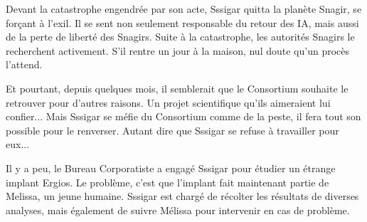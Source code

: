 Devant la catastrophe engendrée par son acte, Sssigar quitta la planète Snagir, se forçant à l'exil. Il se sent non seulement responsable du retour des IA, mais aussi de la perte de liberté des Snagirs. Suite à la catastrophe, les autorités Snagirs le recherchent activement. S'il rentre un jour à la maison, nul doute qu'un procès l'attend. 

Et pourtant, depuis quelques mois, il semblerait que le Consortium souhaite le retrouver pour d'autres raisons. Un projet scientifique qu'ils aimeraient lui confier... Mais Sssigar se méfie du Consortium comme de la peste, il fera tout son possible pour le renverser. Autant dire que Sssigar se refuse à travailler pour eux...

Il y a peu, le Bureau Corporatiste a engagé Sssigar pour étudier un étrange implant Ergios. Le problème, c'est que l'implant fait maintenant partie de Melissa, un jeune humaine. Sssigar est chargé de récolter les résultats de diverses analyses, mais également de suivre Mélissa pour intervenir en cas de problème.

\clearpage

